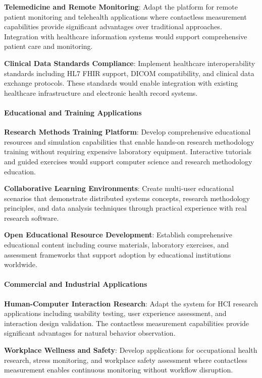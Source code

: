 \documentclass[12pt,a4paper]{article}
\begin{document}
\textbf{Telemedicine and Remote Monitoring}: Adapt the platform for remote patient monitoring and telehealth applications
where contactless measurement capabilities provide significant advantages over traditional approaches. Integration with
healthcare information systems would support comprehensive patient care and monitoring.

\textbf{Clinical Data Standards Compliance}: Implement healthcare interoperability standards including HL7 FHIR support,
DICOM compatibility, and clinical data exchange protocols. These standards would enable integration with existing
healthcare infrastructure and electronic health record systems.

\paragraph{Educational and Training Applications}

\textbf{Research Methods Training Platform}: Develop comprehensive educational resources and simulation capabilities that
enable hands-on research methodology training without requiring expensive laboratory equipment. Interactive tutorials
and guided exercises would support computer science and research methodology education.

\textbf{Collaborative Learning Environments}: Create multi-user educational scenarios that demonstrate distributed systems
concepts, research methodology principles, and data analysis techniques through practical experience with real research
software.

\textbf{Open Educational Resource Development}: Establish comprehensive educational content including course materials,
laboratory exercises, and assessment frameworks that support adoption by educational institutions worldwide.

\paragraph{Commercial and Industrial Applications}

\textbf{Human-Computer Interaction Research}: Adapt the system for HCI research applications including usability testing,
user experience assessment, and interaction design validation. The contactless measurement capabilities provide
significant advantages for natural behavior observation.

\textbf{Workplace Wellness and Safety}: Develop applications for occupational health research, stress monitoring, and
workplace safety assessment where contactless measurement enables continuous monitoring without workflow disruption.
\end{document}
